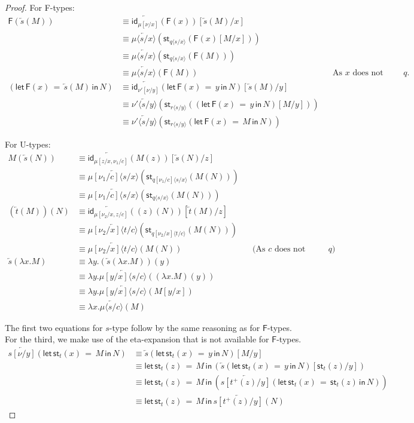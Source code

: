 \documentclass[10pt]{article}
\theoremstyle{definition}
\newcommand{\id}{\mathsf{id}}
\newcommand{\rewrite}[2]{\overleftarrow{#1}(#2)}
\newcommand\UE[2]{\ensuremath{#1(#2)}}
\newcommand\UI[2]{\ensuremath{\lambda #1.#2}}
\newcommand\StI[2]{\ensuremath{\mathsf{st}_{#1}(#2)}}
\newcommand\StE[4]{\ensuremath{\mathsf{let} \, \StI{#1}{#3} \, = \, {#2} \, \mathsf{in} \, #4}}
\newcommand\FE[3]{\ensuremath{\mathsf{let} \, \mathsf{F}(#2) \, = \, {#1} \, \mathsf{in} \, #3}}
\newcommand\FI[1]{\ensuremath{\mathsf{F}{(#1)}}}
\newcommand\TrPlus[2]{\ensuremath{{#1}^+(#2)}}
\newcommand\ap[2]{\ensuremath{#1 \langle #2 \rangle }}
\begin{document}
\begin{proof}
For \textsf{F}-types:
\begin{align*}
\FI{\rewrite{s}{M}} 
&\equiv \rewrite{\id_{\mu[\nu/x]}}{\FI{x}}[\rewrite{s}{M}/x]  \\
&\equiv \rewrite{\ap{\mu}{s/x}}{\StI{\ap{q}{s/x}}{\FI{x}[M/x]}} \\
&\equiv \rewrite{\ap{\mu}{s/x}}{\StI{\ap{q}{s/x}}{\FI{M}}} \\
&\equiv \rewrite{\ap{\mu}{s/x}}{\FI{M}} && \text{As $x$ does not appear in $q$.}\\
(\FE{\rewrite{s}{M}}{x}{N})
&\equiv \rewrite{\id_{\nu'[\nu/y]}}{\FE{y}{x}{N}}[\rewrite{s}{M}/y] \\
&\equiv \rewrite{\ap{\nu'}{s/y}}{\StI{\ap{r}{s/y}}{(\FE{y}{x}{N})[M/y]}} \\
&\equiv \rewrite{\ap{\nu'}{s/y}}{\StI{\ap{r}{s/y}}{\FE{M}{x}{N}}}
\end{align*}

For \textsf{U}-types:
\begin{align*}
\UE{M}{\rewrite{s}{N}}
&\equiv \rewrite{\id_{\mu[z/x, \nu_1/c]}}{\UE{M}{z}}[\rewrite{s}{N}/z] \\
&\equiv \rewrite{\ap{\mu[\nu_1/c]}{s/x}}{\StI{\ap{q[\nu_1/c]}{s/x}}{\UE{M}{N}}} \\
&\equiv \rewrite{\ap{\mu[\nu_1/c]}{s/x}}{\StI{\ap{q}{s/x}}{\UE{M}{N}}} \\
\UE{(\rewrite{t}{M})}{N}
&\equiv \rewrite{\id_{\mu[\nu_2/x, z/c]}}{\UE{(z)}{N}}[\rewrite{t}{M}/z] \\
&\equiv \rewrite{\ap{\mu[\nu_2/x]}{t/c}}{\StI{\ap{q[\nu_2/x]}{t/c}}{\UE{M}{N}}} \\
&\equiv \rewrite{\ap{\mu[\nu_2/x]}{t/c}}{\UE{M}{N}} && \text{(As $c$ does not appear in $q$)}\\
\rewrite{s}{\UI{x}{M}}
&\equiv \UI{y}{\UE{(\rewrite{s}{\UI{x}{M}})}{y}} \\
&\equiv \UI{y}{\rewrite{\ap{\mu[y/x]}{s/c}}{\UE{(\UI{x}{M})}{y}}} \\
&\equiv \UI{y}{\rewrite{\ap{\mu[y/x]}{s/c}}{M[y/x]}} \\
&\equiv \UI{x}{\rewrite{\ap{\mu}{s/c}}{M}}
\end{align*}

The first two equations for $s$-type follow by the same reasoning as for $\mathsf{F}$-types. For the third, we make use of the eta-expansion that is not available for $\mathsf{F}$-types.
\begin{align*}
\rewrite{s[\nu/y]}{\StE{t}{M}{x}{N}}
&\equiv \rewrite{s}{\StE{t}{y}{x}{N}} [M/y] \\
&\equiv \StE{t}{M}{z}{(\rewrite{s}{\StE{t}{y}{x}{N}}[\StI{t}{z}/y])} \\
&\equiv \StE{t}{M}{z}{(\rewrite{s[\TrPlus{t}{z}/y]}{\StE{t}{\StI{t}{z}}{x}{N}})} \\
&\equiv \StE{t}{M}{z}{\rewrite{s[\TrPlus{t}{z}/y]}{N}}
\end{align*}
\end{proof}
\end{document}
